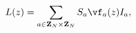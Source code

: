 \begin{equation}
L(z)=\sum_{a\in {\bf Z}_N\times {\bf Z}_N }
S_a \vf_a(z) I_a,
\label{Laxxx}
\end{equation}

